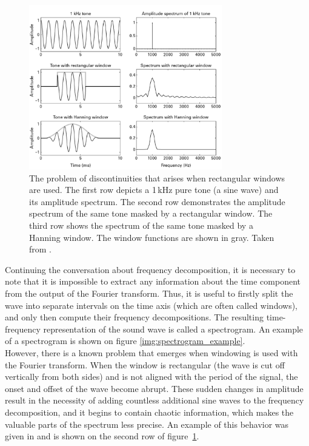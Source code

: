 \begin{figure}[t]
	\centering
	\includegraphics[width=0.75\textwidth]{include/windowing_example}
	\caption[An example of windowing and the problem of discontinuities]{The problem of discontinuities that arises when rectangular windows are used. The first row depicts a 1\,kHz pure tone (a sine wave) and its amplitude spectrum. The second row demonstrates the amplitude spectrum of the same tone masked by a rectangular window. The third row shows the spectrum of the same tone masked by a Hanning window. The window functions are shown in gray. Taken from \cite{Schnupp2011}.}
	\label{img:windowing_example}
\end{figure}

Continuing the conversation about frequency decomposition, it is necessary to note that it is impossible to extract any information about the time component from the output of the Fourier transform. Thus, it is useful to firstly split the wave into separate intervals on the time axis (which are often called windows), and only then compute their frequency decompositions. The resulting time-frequency representation of the sound wave is called a spectrogram. An example of a spectrogram is shown on figure \ref{img:spectrogram_example}.\\

However, there is a known problem that emerges when windowing is used with the Fourier transform. When the window is rectangular (the wave is cut off vertically from both sides) and is not aligned with the period of the signal, the onset and offset of the wave become abrupt. These sudden changes in amplitude result in the necessity of adding countless additional sine waves to the frequency decomposition, and it begins to contain chaotic information, which makes the valuable parts of the spectrum less precise. An example of this behavior was given in \cite{Schnupp2011} and is shown on the second row of figure~\ref{img:windowing_example}.\\

